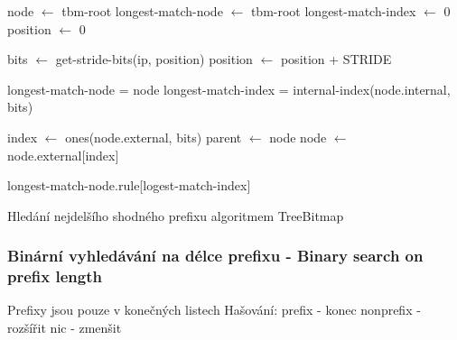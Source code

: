 \begin{algorithm}[H]
	\label{alg:treebitmap}
	node $\leftarrow$ tbm-root\;
	longest-match-node $\leftarrow$ tbm-root\;
	longest-match-index $\leftarrow$ 0\;
	position $\leftarrow$ 0\;
	{
		bits $\leftarrow$ get-stride-bits(ip, position)\;
		position $\leftarrow$ position + STRIDE\;


		{
			longest-match-node = node\;
			longest-match-index = internal-index(node.internal, bits)\;
		}

		index $\leftarrow$ ones(node.external, bits)\;
		parent $\leftarrow$ node\;
		node $\leftarrow$ node.external[index]\;
	}
	\Return longest-match-node.rule[logest-match-index]\;
	\caption{Hledání nejdelšího shodného prefixu algoritmem TreeBitmap}
\end{algorithm}

\subsubsection{Binární vyhledávání na délce prefixu - Binary search on prefix length} %

Prefixy jsou pouze v konečných listech
Hašování:
	prefix - konec
	nonprefix - rozšířit
	nic - zmenšit

